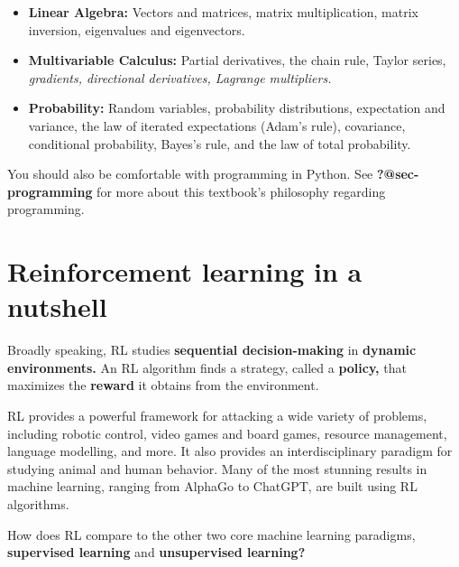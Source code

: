 \documentclass[
  letterpaper,
  DIV=11,
  numbers=noendperiod]{scrreprt}
\providecommand{\tightlist}{%
  \setlength{\itemsep}{0pt}\setlength{\parskip}{0pt}}\usepackage{longtable,booktabs,array}
\theoremstyle{plain}
\theoremstyle{plain}
\theoremstyle{definition}
\theoremstyle{definition}
\theoremstyle{remark}
\begin{document}
\begin{itemize}
\tightlist
\item
  \textbf{Linear Algebra:} Vectors and matrices, matrix multiplication,
  matrix inversion, eigenvalues and eigenvectors.
\item
  \textbf{Multivariable Calculus:} Partial derivatives, the chain rule,
  Taylor series, \emph{gradients, directional derivatives, Lagrange
  multipliers.}
\item
  \textbf{Probability:} Random variables, probability distributions,
  expectation and variance, the law of iterated expectations (Adam's
  rule), covariance, conditional probability, Bayes's rule, and the law
  of total probability.
\end{itemize}

You should also be comfortable with programming in Python. See
\textbf{?@sec-programming} for more about this textbook's philosophy
regarding programming.

\section*{Reinforcement learning in a
nutshell}\label{reinforcement-learning-in-a-nutshell}


Broadly speaking, RL studies \textbf{sequential decision-making} in
\textbf{dynamic environments.} An RL algorithm finds a strategy, called
a \textbf{policy,} that maximizes the \textbf{reward} it obtains from
the environment.

RL provides a powerful framework for attacking a wide variety of
problems, including robotic control, video games and board games,
resource management, language modelling, and more. It also provides an
interdisciplinary paradigm for studying animal and human behavior. Many
of the most stunning results in machine learning, ranging from AlphaGo
to ChatGPT, are built using RL algorithms.

How does RL compare to the other two core machine learning paradigms,
\textbf{supervised learning} and \textbf{unsupervised learning?}
\end{document}
